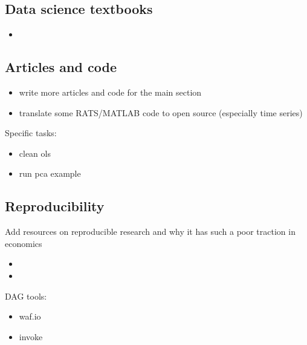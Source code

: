 \documentclass[letterpaper,10pt,english]{sphinxmanual}
\begin{document}
\subsection{Data science textbooks}
\label{\detokenize{roadmap:data-science-textbooks}}\begin{itemize}
\item {} 

\end{itemize}


\subsection{Articles and code}
\label{\detokenize{roadmap:articles-and-code}}\begin{itemize}
\item {} 
write more articles and code for the main section

\item {} 
translate some RATS/MATLAB code to open source (especially time series)

\end{itemize}

Specific tasks:
\begin{itemize}
\item {} 
clean ols

\item {} 
run pca example

\end{itemize}


\subsection{Reproducibility}
\label{\detokenize{roadmap:reproducibility}}
Add resources on reproducible research and why it has such a poor traction in economics
\begin{itemize}
\item {} 

\item {} 

\end{itemize}

DAG tools:
\begin{itemize}
\item {} 
waf.io

\item {} 
invoke

\end{itemize}
\end{document}
